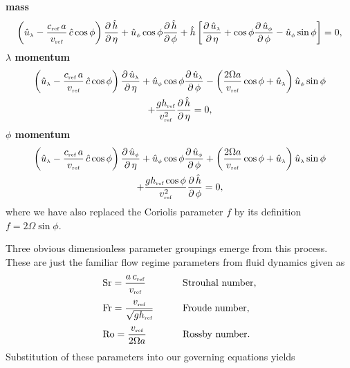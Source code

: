 {\bfseries mass}
\begin{equation}
\left(\hat{u}_{\scriptscriptstyle \lambda}-\frac{c_{\mbox{\tiny ref}}\,a}{v_{\mbox{\tiny ref}}}\,\hat{c}\cos\phi\right)\frac{\partial \, \hat{h}}{\partial \, \eta} + \hat{u}_{\scriptscriptstyle \phi}\cos\phi\frac{\partial \, \hat{h}}{\partial \, \phi}+\hat{h}\left[\frac{\partial \, \hat{u}_{\scriptscriptstyle \lambda}}{\partial \, \eta}+\cos\phi\frac{\partial \, \hat{u}_{\scriptscriptstyle \phi}}{\partial \, \phi}-\hat{u}_{\scriptscriptstyle \phi}\sin\phi\right]=0, \label{eq:massincom1non}
\end{equation}
{\bfseries \boldmath$\lambda$ momentum}
\begin{multline}
\left(\hat{u}_{\scriptscriptstyle \lambda}-\frac{c_{\mbox{\tiny ref}}\,a}{v_{\mbox{\tiny ref}}}\,\hat{c}\cos\phi\right)\frac{\partial \, \hat{u}_{\scriptscriptstyle \lambda}}{\partial \, \eta} + \hat{u}_{\scriptscriptstyle \phi}\cos\phi\frac{\partial \, \hat{u}_{\scriptscriptstyle \lambda}}{\partial \, \phi} - \left(\frac{2\Omega a}{v_{\mbox{\tiny ref}}}\cos\phi + \hat{u}_{\scriptscriptstyle \lambda}\right)\hat{u}_{\scriptscriptstyle \phi}\sin\phi \\+ \frac{g h_{\mbox{\tiny ref}}}{v^2_{\mbox{\tiny ref}}}\frac{\partial \, \hat{h}}{\partial \, \eta} = 0, \label{eq:lamincom1non}
\end{multline}
{\bfseries \boldmath$\phi$ momentum}
\begin{multline}
\left(\hat{u}_{\scriptscriptstyle \lambda}-\frac{c_{\mbox{\tiny ref}}\,a}{v_{\mbox{\tiny ref}}}\,\hat{c}\cos\phi\right)\frac{\partial \, \hat{u}_{\scriptscriptstyle \phi}}{\partial \, \eta} + \hat{u}_{\scriptscriptstyle \phi}\cos\phi\frac{\partial \, \hat{u}_{\scriptscriptstyle \phi}}{\partial \, \phi} + \left(\frac{2 \Omega a}{v_{\mbox{\tiny ref}}}\cos\phi + \hat{u}_{\scriptscriptstyle \lambda} \right)\hat{u}_{\scriptscriptstyle \lambda}\sin\phi \\+ \frac{g h_{\mbox{\tiny ref}}\cos\phi}{v^2_{\mbox{\tiny ref}}}\frac{\partial \, \hat{h}}{\partial \, \phi} = 0, \label{eq:phiincom1non}
\end{multline}
where we have also replaced the Coriolis parameter $f$ by its definition $f=2\Omega\sin\phi$.

Three obvious dimensionless parameter groupings emerge from this process. These are just the familiar flow regime parameters from fluid dynamics given as
\begin{alignat*}{2}
&\mathrm{Sr} = \displaystyle \frac{a\,c_{\mbox{\tiny ref}}}{v_{\mbox{\tiny ref}}} &\qquad& \mbox{Strouhal number,} \\[1mm]
&\mathrm{Fr} = \displaystyle \frac{v_{\mbox{\tiny ref}}}{\sqrt{gh_{\mbox{\tiny ref}}}} && \mbox{Froude number,} \\[1mm]
&\mathrm{Ro} = \displaystyle \frac{v_{\mbox{\tiny ref}}}{2\Omega a} && \mbox{Rossby number.}
\end{alignat*}
Substitution of these parameters into our governing equations yields 

